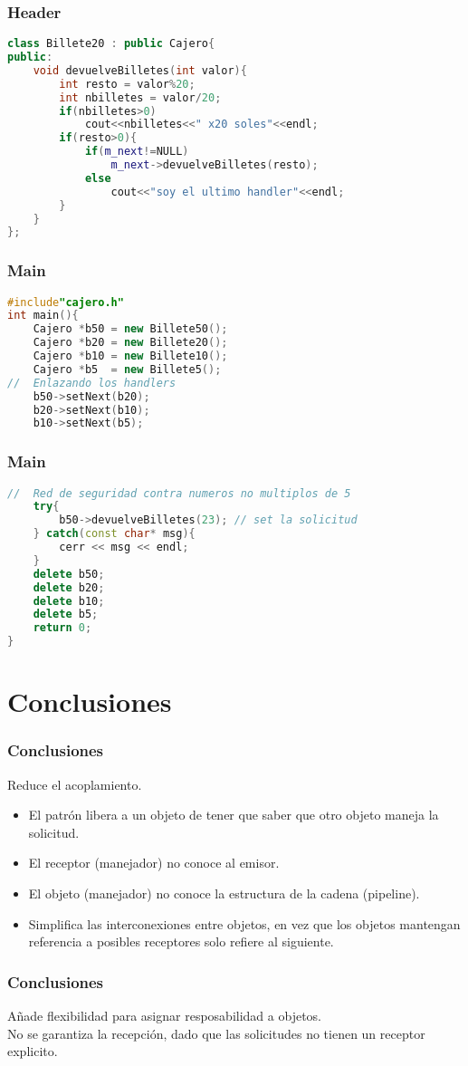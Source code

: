 \documentclass[xcolor=dvipsnames]{beamer}
\begin{document}
\begin{frame}[fragile]
 \frametitle{Header}
 \begin{lstlisting}[language=C++]
class Billete20 : public Cajero{
public:
    void devuelveBilletes(int valor){
        int resto = valor%20;
        int nbilletes = valor/20;
        if(nbilletes>0)
            cout<<nbilletes<<" x20 soles"<<endl;
        if(resto>0){
            if(m_next!=NULL)
                m_next->devuelveBilletes(resto);
            else
                cout<<"soy el ultimo handler"<<endl;
        }
    }
};
  \end{lstlisting}
\end{frame}

\begin{frame}[fragile]
 \frametitle{Main}
 \begin{lstlisting}[language=C++]
#include"cajero.h"
int main(){
    Cajero *b50 = new Billete50();
    Cajero *b20 = new Billete20();
    Cajero *b10 = new Billete10();
    Cajero *b5  = new Billete5();
//  Enlazando los handlers
    b50->setNext(b20);
    b20->setNext(b10);
    b10->setNext(b5);
  \end{lstlisting}
\end{frame}

\begin{frame}[fragile]
 \frametitle{Main}
 \begin{lstlisting}[language=C++]
//  Red de seguridad contra numeros no multiplos de 5
    try{
        b50->devuelveBilletes(23); // set la solicitud
    } catch(const char* msg){
        cerr << msg << endl;
    }
    delete b50;
    delete b20;
    delete b10;
    delete b5;
    return 0;
}
  \end{lstlisting}
\end{frame}

\section{Conclusiones}
\begin{frame}
 \frametitle{Conclusiones}
  Reduce el acoplamiento.
 \begin{itemize}
  \item El patr\'on libera a un objeto de tener que saber que otro objeto maneja la solicitud.
  \item El receptor (manejador) no conoce al emisor.
  \item El objeto (manejador) no conoce la estructura de la cadena (pipeline).
  \item Simplifica las interconexiones entre objetos, en vez que los objetos mantengan referencia a posibles receptores solo refiere al siguiente.
 \end{itemize}
\end{frame}

\begin{frame}
 \frametitle{Conclusiones}
 A\~nade flexibilidad para asignar resposabilidad a objetos. \\
 
 No se garantiza la recepci\'on, dado que las solicitudes no tienen un receptor explicito.
\end{frame}
\end{document}
